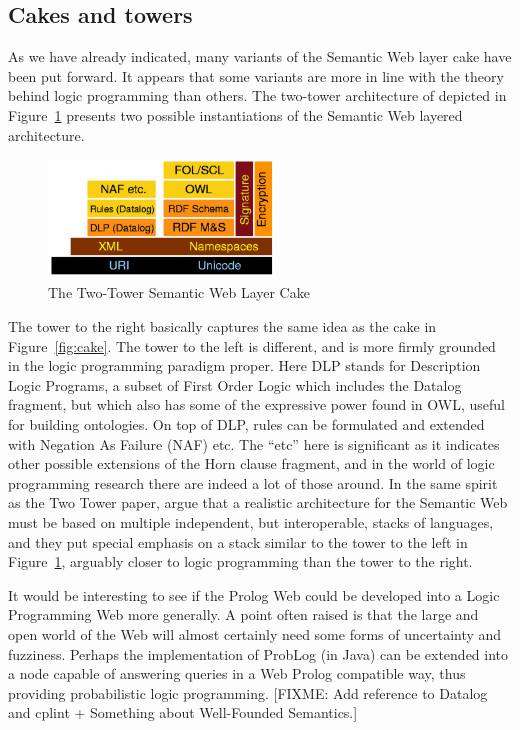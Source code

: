 \documentclass{tlp}
\begin{document}
\subsection{Cakes and towers}\label{sec:other-cakes}

\noindent As we have already indicated, many variants of the Semantic Web layer cake have been put forward. It appears that some variants are more in line with the theory behind logic programming than others. The two-tower architecture of \cite{Horrocks2005} depicted in Figure~\ref{fig:cake-hendler} presents two possible instantiations of the Semantic Web layered architecture. 

\begin{figure}[h]
    \centering
	\includegraphics[width=6cm]{cake-hendler}
    \caption{The Two-Tower Semantic Web Layer Cake}
    \label{fig:cake-hendler}
\end{figure}

\noindent The tower to the right basically captures the same idea as the cake in Figure~\ref{fig:cake}. The tower to the left is different, and is more firmly grounded in the logic programming paradigm proper. Here DLP stands for Description Logic Programs, a subset of First Order Logic which includes the Datalog fragment, but which also has some of the expressive power found in OWL, useful for building ontologies. On top of DLP, rules can be formulated and extended with Negation As Failure (NAF) etc. The ``etc'' here is significant as it indicates other possible extensions of the Horn clause fragment, and in the world of logic programming research there are indeed a lot of those around. In the same spirit as the Two Tower paper, \cite{Kifer2005} argue that a realistic architecture for the Semantic Web must be based on multiple independent, but interoperable, stacks of languages, and they put special emphasis on a stack similar to the tower to the left in Figure~\ref{fig:cake-hendler}, arguably closer to logic programming than the tower to the right.

It would be interesting to see if the Prolog Web could be developed into a Logic Programming Web more generally. A point often raised is that the large and open world of the Web will almost certainly need some forms of uncertainty and fuzziness. Perhaps the implementation of ProbLog (in Java) can be extended into a node capable of answering  queries in a Web Prolog compatible way, thus providing probabilistic logic programming.  [FIXME: Add reference to Datalog and cplint + Something about Well-Founded Semantics.]
\end{document}
